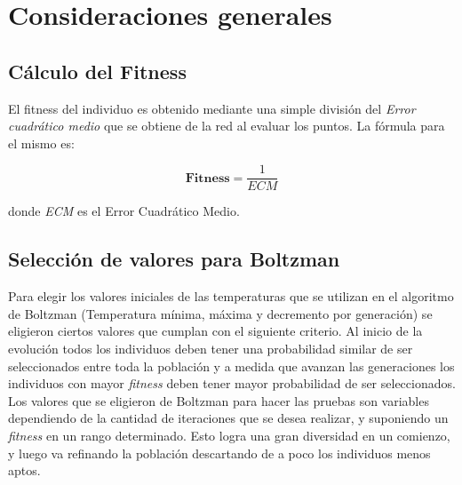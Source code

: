 \documentclass{sig-alternate}
\begin{document}





	\section{Consideraciones generales}

		\subsection{Cálculo del Fitness}

			El fitness del individuo es obtenido mediante una simple división del \textit{Error cuadrático medio} que se obtiene de la red al evaluar los puntos.
			La fórmula para el mismo es:

			\begin{equation}
				\textbf{Fitness} = \dfrac{1}{ECM}
			\end{equation}

			donde \textit{ECM} es el Error Cuadrático Medio.

		\subsection{Selección de valores para Boltzman}

			Para elegir los valores iniciales de las temperaturas que se utilizan en el algoritmo de Boltzman (Temperatura mínima, máxima y decremento por generación) se eligieron ciertos valores que cumplan con el siguiente criterio. Al inicio de la evolución todos los individuos deben tener una probabilidad similar de ser seleccionados entre toda la población y a medida que avanzan las generaciones los individuos con mayor \textit{fitness} deben tener mayor probabilidad de ser seleccionados.
			Los valores que se eligieron de Boltzman para hacer las pruebas son variables dependiendo de la cantidad de iteraciones que se desea realizar, y suponiendo un \textit{fitness} en un rango determinado. Esto logra una gran diversidad en un comienzo, y luego va refinando la población descartando de a poco los individuos menos aptos. 	
\end{document}
